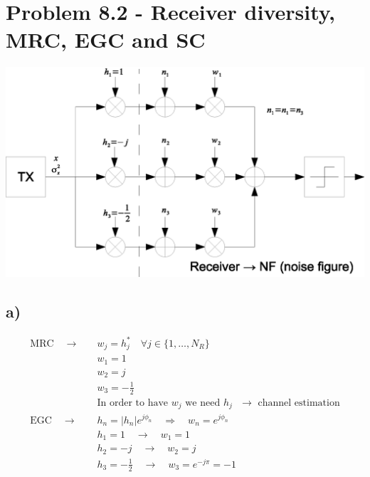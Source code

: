 \section*{Problem 8.2 - Receiver diversity, MRC, EGC and SC}
\includegraphics[width=1\textwidth]{MIMO_receiver.eps} \\
\subsection*{a)}
\begin{align*}
	\mathrm{MRC}\quad\rightarrow\quad & w_j =h_j^*\quad\forall j\in\{1,\ldots,N_R\} \\
	& w_1=1 \\
	& w_2=j \\
	& w_3=-\frac{1}{2} \\
	&\text{In order to have $w_j$ we need $h_j$ $\rightarrow$ channel estimation} \\
	\mathrm{EGC}\quad\rightarrow\quad & h_n=\left|h_n\right|e^{j\phi_n}\quad\Rightarrow\quad w_n=e^{j\phi_n} \\
	& h_1=1\quad\rightarrow\quad w_1=1 \\
	& h_2=-j\quad\rightarrow\quad w_2=j \\
	& h_3=-\frac{1}{2}\quad\rightarrow\quad w_3=e^{-j\pi}=-1
\end{align*}


